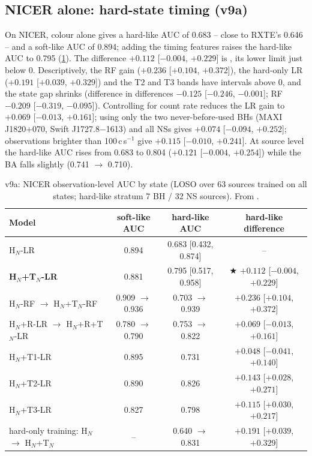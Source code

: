 \subsection{NICER alone: hard-state timing (v9a)}\label{sec:p5v9a}
\Primary{} On NICER, colour alone gives a hard-like AUC of 0.683 -- close to RXTE's 0.646 -- and a soft-like AUC of 0.894; adding the
timing features raises the hard-like AUC to 0.795 (\cref{tab:p5v9a}). The difference $+0.112$ [$-0.004$, $+0.229$] is
\NotDetected{}, its lower limit just below 0. Descriptively, the RF gain ($+0.236$ [$+0.104$, $+0.372$]), the hard-only LR
($+0.191$ [$+0.039$, $+0.329$]) and the T2 and T3 bands have intervals above 0, and the state gap shrinks (difference in
differences $-0.125$ [$-0.246$, $-0.001$]; RF $-0.209$ [$-0.319$, $-0.095$]). Controlling for count rate reduces the LR gain to
$+0.069$ [$-0.013$, $+0.161$]; using only the two never-before-used BHs (MAXI J1820+070, Swift J1727.8$-$1613) and all NSs gives
$+0.074$ [$-0.094$, $+0.252$]; observations brighter than 100\,c\,s$^{-1}$ give $+0.115$ [$-0.010$, $+0.241$]. At source level the
hard-like AUC rises from 0.683 to 0.804 ($+0.121$ [$-0.004$, $+0.254$]) while the BA falls slightly (0.741 $\to$ 0.710).

\begin{table}[htbp]
\centering\small
\caption[NICER hard-state timing]{\Primary{} v9a: NICER observation-level AUC by state (LOSO over 63 sources trained on all states;
hard-like stratum 7 BH / 32 NS sources). From .}
\label{tab:p5v9a}
\setlength{\tabcolsep}{4pt}
\begin{tabular}{@{}lccc@{}}
\toprule
Model & soft-like AUC & hard-like AUC & hard-like difference \\
\midrule
H$_N$-LR & 0.894 & 0.683 [0.432, 0.874] & -- \\
\textbf{H$_N$+T$_N$-LR} & 0.881 & 0.795 [0.517, 0.958] & $\bigstar$ $+0.112$ [$-0.004$, $+0.229$] \\
H$_N$-RF $\to$ H$_N$+T$_N$-RF & 0.909 $\to$ 0.936 & 0.703 $\to$ 0.939 & $+0.236$ [$+0.104$, $+0.372$] \\
H$_N$+R-LR $\to$ H$_N$+R+T$_N$-LR & 0.780 $\to$ 0.790 & 0.753 $\to$ 0.822 & $+0.069$ [$-0.013$, $+0.161$] \\
H$_N$+T1-LR & 0.895 & 0.731 & $+0.048$ [$-0.041$, $+0.140$] \\
H$_N$+T2-LR & 0.890 & 0.826 & $+0.143$ [$+0.028$, $+0.271$] \\
H$_N$+T3-LR & 0.827 & 0.798 & $+0.115$ [$+0.030$, $+0.217$] \\
hard-only training: H$_N$ $\to$ H$_N$+T$_N$ & -- & 0.640 $\to$ 0.831 & $+0.191$ [$+0.039$, $+0.329$] \\
\bottomrule
\end{tabular}
\end{table}

